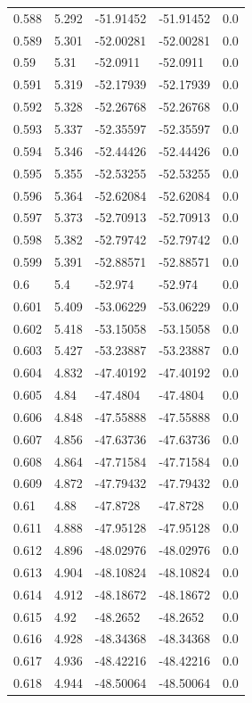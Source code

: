 \begin{tabular}{lllll}
0.588 & 5.292 & -51.91452 & -51.91452 & 0.0 \\
0.589 & 5.301 & -52.00281 & -52.00281 & 0.0 \\
0.59 & 5.31 & -52.0911 & -52.0911 & 0.0 \\
0.591 & 5.319 & -52.17939 & -52.17939 & 0.0 \\
0.592 & 5.328 & -52.26768 & -52.26768 & 0.0 \\
0.593 & 5.337 & -52.35597 & -52.35597 & 0.0 \\
0.594 & 5.346 & -52.44426 & -52.44426 & 0.0 \\
0.595 & 5.355 & -52.53255 & -52.53255 & 0.0 \\
0.596 & 5.364 & -52.62084 & -52.62084 & 0.0 \\
0.597 & 5.373 & -52.70913 & -52.70913 & 0.0 \\
0.598 & 5.382 & -52.79742 & -52.79742 & 0.0 \\
0.599 & 5.391 & -52.88571 & -52.88571 & 0.0 \\
0.6 & 5.4 & -52.974 & -52.974 & 0.0 \\
0.601 & 5.409 & -53.06229 & -53.06229 & 0.0 \\
0.602 & 5.418 & -53.15058 & -53.15058 & 0.0 \\
0.603 & 5.427 & -53.23887 & -53.23887 & 0.0 \\
0.604 & 4.832 & -47.40192 & -47.40192 & 0.0 \\
0.605 & 4.84 & -47.4804 & -47.4804 & 0.0 \\
0.606 & 4.848 & -47.55888 & -47.55888 & 0.0 \\
0.607 & 4.856 & -47.63736 & -47.63736 & 0.0 \\
0.608 & 4.864 & -47.71584 & -47.71584 & 0.0 \\
0.609 & 4.872 & -47.79432 & -47.79432 & 0.0 \\
0.61 & 4.88 & -47.8728 & -47.8728 & 0.0 \\
0.611 & 4.888 & -47.95128 & -47.95128 & 0.0 \\
0.612 & 4.896 & -48.02976 & -48.02976 & 0.0 \\
0.613 & 4.904 & -48.10824 & -48.10824 & 0.0 \\
0.614 & 4.912 & -48.18672 & -48.18672 & 0.0 \\
0.615 & 4.92 & -48.2652 & -48.2652 & 0.0 \\
0.616 & 4.928 & -48.34368 & -48.34368 & 0.0 \\
0.617 & 4.936 & -48.42216 & -48.42216 & 0.0 \\
0.618 & 4.944 & -48.50064 & -48.50064 & 0.0 \\

\end{tabular}
